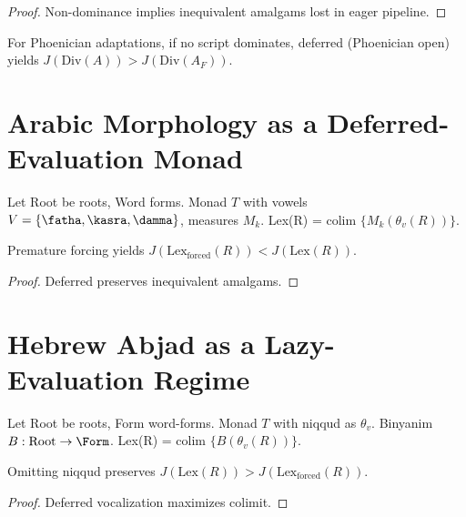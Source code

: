 \documentclass[12pt]{article}
\begin{document}
\begin{proof}
Non-dominance implies inequivalent amalgams lost in eager pipeline.
\end{proof}

\begin{corollary}
For Phoenician adaptations, if no script dominates, deferred (Phoenician open) yields $J(\mathrm{Div}(A)) > J(\mathrm{Div}(A_F))$.
\end{corollary}

\section{Arabic Morphology as a Deferred-Evaluation Monad}
\label{app:arabic}
Let Root be roots, Word forms. Monad $T$ with vowels $V = \{\fatha, \kasra, \damma\}$, measures $M_k$. Lex(R) = colim $\{M_k(\theta_v(R))\}$.

\begin{corollary}
Premature forcing yields $J(\mathrm{Lex}_{\mathrm{forced}}(R)) < J(\mathrm{Lex}(R))$.
\end{corollary}

\begin{proof}
Deferred preserves inequivalent amalgams.
\end{proof}

\section{Hebrew Abjad as a Lazy-Evaluation Regime}
\label{app:hebrew}
Let Root be roots, Form word-forms. Monad $T$ with niqqud as $\theta_v$. Binyanim $B: \mathrm{Root} \to \Form$. Lex(R) = colim $\{B(\theta_v(R))\}$.

\begin{corollary}
Omitting niqqud preserves $J(\mathrm{Lex}(R)) > J(\mathrm{Lex}_{\mathrm{forced}}(R))$.
\end{corollary}

\begin{proof}
Deferred vocalization maximizes colimit.
\end{proof}
\end{document}
